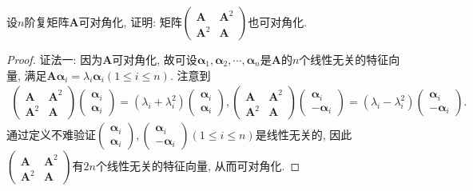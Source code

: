 \documentclass[../../main.tex]{subfiles}
\begin{document}
\begin{example}
设\(n\)阶复矩阵\(\boldsymbol{A}\)可对角化, 证明: 矩阵\(\begin{pmatrix}
\boldsymbol{A}&\boldsymbol{A}^{2}\\
\boldsymbol{A}^{2}&\boldsymbol{A}
\end{pmatrix}\)也可对角化.
\end{example}
\begin{proof}
{\color{blue}证法一:}
因为\(\boldsymbol{A}\)可对角化, 故可设\(\boldsymbol{\alpha}_{1},\boldsymbol{\alpha}_{2},\cdots,\boldsymbol{\alpha}_{n}\)是\(\boldsymbol{A}\)的\(n\)个线性无关的特征向量, 满足\(\boldsymbol{A}\boldsymbol{\alpha}_{i}=\lambda_{i}\boldsymbol{\alpha}_{i}(1\leqslant  i\leqslant  n)\). 注意到
\begin{align*}
\begin{pmatrix}
\boldsymbol{A}&\boldsymbol{A}^{2}\\
\boldsymbol{A}^{2}&\boldsymbol{A}
\end{pmatrix}\begin{pmatrix}
\boldsymbol{\alpha}_{i}\\
\boldsymbol{\alpha}_{i}
\end{pmatrix}=(\lambda_{i}+\lambda_{i}^{2})\begin{pmatrix}
\boldsymbol{\alpha}_{i}\\
\boldsymbol{\alpha}_{i}
\end{pmatrix}, \begin{pmatrix}
\boldsymbol{A}&\boldsymbol{A}^{2}\\
\boldsymbol{A}^{2}&\boldsymbol{A}
\end{pmatrix}\begin{pmatrix}
\boldsymbol{\alpha}_{i}\\
-\boldsymbol{\alpha}_{i}
\end{pmatrix}=(\lambda_{i}-\lambda_{i}^{2})\begin{pmatrix}
\boldsymbol{\alpha}_{i}\\
-\boldsymbol{\alpha}_{i}
\end{pmatrix}.
\end{align*}
通过定义不难验证\(\begin{pmatrix}
\boldsymbol{\alpha}_{i}\\
\boldsymbol{\alpha}_{i}
\end{pmatrix},\begin{pmatrix}
\boldsymbol{\alpha}_{i}\\
-\boldsymbol{\alpha}_{i}
\end{pmatrix}(1\leqslant  i\leqslant  n)\)是线性无关的, 因此\(\begin{pmatrix}
\boldsymbol{A}&\boldsymbol{A}^{2}\\
\boldsymbol{A}^{2}&\boldsymbol{A}
\end{pmatrix}\)有\(2n\)个线性无关的特征向量, 从而可对角化. 


\end{proof}
\end{document}
